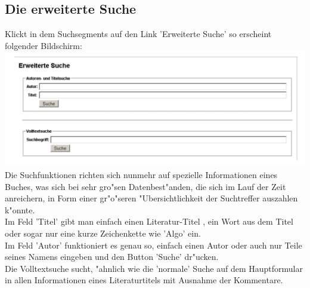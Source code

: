 \subsection{Die erweiterte Suche}
Klickt in dem Suchsegments auf den Link 'Erweiterte Suche' so erscheint folgender Bildschirm:\\
\includegraphics[scale=0.8]{ext_suche}\\
Die Suchfunktionen richten sich nunmehr auf spezielle Informationen eines Buches, was sich bei sehr gro"sen Datenbest"anden, die sich im Lauf der Zeit anreichern, in Form einer gr"o"seren "Ubersichtlichkeit der Suchtreffer auszahlen k"onnte.\\
Im Feld 'Titel' gibt man einfach einen Literatur-Titel , ein Wort aus dem Titel oder sogar nur eine kurze Zeichenkette wie 'Algo' ein.\\
Im Feld 'Autor' funktioniert es genau so, einfach einen Autor oder auch nur Teile seines Namens eingeben und den Button 'Suche' dr"ucken.\\
Die Volltextsuche sucht, "ahnlich wie die 'normale' Suche auf dem Hauptformular in allen Informationen eines Literaturtitels mit Ausnahme der Kommentare.

